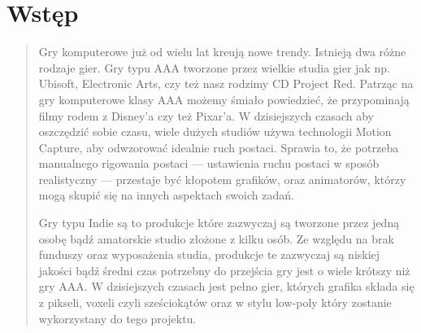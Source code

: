 \chapter*{Wstęp}
\begin{quotation}
\indent Gry komputerowe już od wielu lat kreują nowe trendy. Istnieją dwa różne rodzaje gier. 
Gry typu AAA tworzone przez wielkie studia gier jak np. Ubisoft, Electronic Arts, czy też nasz rodzimy CD Project Red. 
Patrząc na gry komputerowe klasy AAA możemy śmiało powiedzieć, że przypominają filmy rodem z Disney'a czy też Pixar'a. 
W dzisiejszych czasach aby oszczędzić sobie czasu, wiele dużych studiów używa technologii Motion Capture, aby odwzorować idealnie ruch postaci. Sprawia to,
że potrzeba manualnego rigowania postaci --- ustawienia ruchu postaci w sposób realistyczny --- przestaje być kłopotem grafików, oraz animatorów, którzy mogą skupić się na innych aspektach swoich zadań.

\indent Gry typu Indie są to produkcje które zazwyczaj są tworzone przez jedną osobę bądź amatorskie studio złożone z kilku osób. Ze względu na brak funduszy oraz wyposażenia studia, produkcje te zazwyczaj są niskiej jakości bądź średni czas potrzebny do przejścia gry jest o wiele krótszy niż gry AAA.
W dzisiejszych czasach jest pełno gier, których grafika składa się z pikseli, voxeli czyli sześciokątów oraz w stylu low-poly który zostanie wykorzystany do tego projektu.

\newpage 
\end{quotation}

